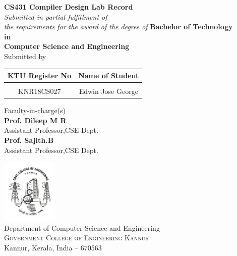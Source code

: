 \begin{titlepage}
	\clearpage
	\vspace*{\fill}
	\thispagestyle{empty}
	\begin{onehalfspace}
	\begin{center}
			
		\textup{\large{\bf CS431 Compiler Design Lab Record}}
		\\[0.2in]
		
       \small \textit{Submitted in partial fulfillment of\\ the requirements for the award of the degree of}
		\vspace{.2in}
		{\bf Bachelor of Technology \\in\\ Computer Science and Engineering}\\[0.5in]
		
		\normalsize Submitted by \\
		\begin{table}[h]
			\centering
			\begin{tabular}{cc}
				KTU Register No & Name of Student
				\\ \hline \\
				KNR18CS027      & Edwin Jose George
			\end{tabular}
		\end{table}
		
		\vspace{.1in}
		Faculty-in-charge(s)\\ [0.1in]
		\textbf{Prof. Dileep M R}\\ 
		Assistant Professor,CSE Dept.\\ [0.1in]
		\textbf{Prof. Sajith.B}\\
		Assistant Professor,CSE Dept. \\ [0.2in]
		
		\vfill
	
		\includegraphics[width=0.2\textwidth]{./gcek_logo.jpg}\\[0.1in]
		\Large{Department of Computer Science and Engineering}\\
		\normalsize \textsc{Government College of Engineering Kannur}\\ Kannur, Kerala, India -- 670563 \\
		\vspace{0.2cm}
	
	\end{center}
	\end{onehalfspace}
	\vspace*{\fill}
\end{titlepage}
